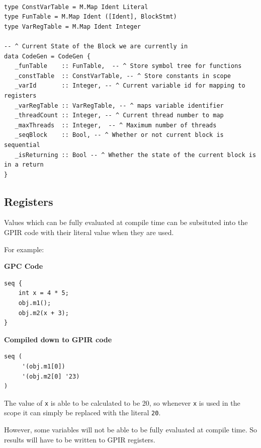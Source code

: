 \begin{lstlisting}[style=myHaskell]

type ConstVarTable = M.Map Ident Literal
type FunTable = M.Map Ident ([Ident], BlockStmt)
type VarRegTable = M.Map Ident Integer

-- ^ Current State of the Block we are currently in
data CodeGen = CodeGen {
   _funTable    :: FunTable,  -- ^ Store symbol tree for functions
   _constTable  :: ConstVarTable, -- ^ Store constants in scope
   _varId       :: Integer, -- ^ Current variable id for mapping to registers
   _varRegTable :: VarRegTable, -- ^ maps variable identifier
   _threadCount :: Integer, -- ^ Current thread number to map
   _maxThreads  :: Integer,  -- ^ Maximum number of threads
   _seqBlock    :: Bool, -- ^ Whether or not current block is sequential
   _isReturning :: Bool -- ^ Whether the state of the current block is in a return
}

\end{lstlisting}


\subsection{Registers}
Values which can be fully evaluated at compile time can be subsituted into the
GPIR code with their literal value when they are used.

For example:

\begin{center}{\textbf{GPC Code}}
\end{center}

\begin{lstlisting}[style=myGPC, frame=single]
seq {
    int x = 4 * 5;
    obj.m1();
    obj.m2(x + 3);
}
\end{lstlisting}

\begin{center}{\textbf{Compiled down to GPIR code}}
\end{center}

\begin{lstlisting}[style=myGPIR, frame=single]
seq (
     '(obj.m1[0]) 
     '(obj.m2[0] '23)
)
\end{lstlisting}

The value of \texttt{x} is able to be calculated to be 20, so whenever
\texttt{x} is used in the scope it can simply be replaced with the literal \texttt{20}.

However, some variables will not be able to be fully evaluated at compile time.
So results will have to be written to GPIR registers.

